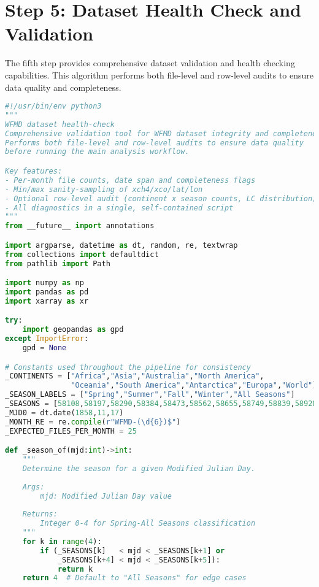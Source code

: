 \section{Step 5: Dataset Health Check and Validation}
\label{sec:appendixB_step5}

The fifth step provides comprehensive dataset validation and health checking capabilities. This algorithm performs both file-level and row-level audits to ensure data quality and completeness.

\begin{lstlisting}[language=Python, caption=Dataset Health Check Algorithm, label=alg:step05_health_check]
#!/usr/bin/env python3
"""
WFMD dataset health-check
Comprehensive validation tool for WFMD dataset integrity and completeness.
Performs both file-level and row-level audits to ensure data quality
before running the main analysis workflow.

Key features:
- Per-month file counts, date span and completeness flags
- Min/max sanity-sampling of xch4/xco/lat/lon
- Optional row-level audit (continent x season counts, LC distribution)
- All diagnostics in a single, self-contained script
"""
from __future__ import annotations

import argparse, datetime as dt, random, re, textwrap
from collections import defaultdict
from pathlib import Path

import numpy as np
import pandas as pd
import xarray as xr

try:
    import geopandas as gpd
except ImportError:
    gpd = None

# Constants used throughout the pipeline for consistency
_CONTINENTS = ["Africa","Asia","Australia","North America",
               "Oceania","South America","Antarctica","Europa","World"]
_SEASON_LABELS = ["Spring","Summer","Fall","Winter","All Seasons"]
_SEASONS = [58108,58197,58290,58384,58473,58562,58655,58749,58839,58928,59020,59114]
_MJD0 = dt.date(1858,11,17)
_MONTH_RE = re.compile(r"WFMD-(\d{6})$")
_EXPECTED_FILES_PER_MONTH = 25

def _season_of(mjd:int)->int:
    """
    Determine the season for a given Modified Julian Day.
    
    Args:
        mjd: Modified Julian Day value
        
    Returns:
        Integer 0-4 for Spring-All Seasons classification
    """
    for k in range(4):
        if (_SEASONS[k]   < mjd < _SEASONS[k+1] or
            _SEASONS[k+4] < mjd < _SEASONS[k+5]):
            return k
    return 4  # Default to "All Seasons" for edge cases


\end{lstlisting}

